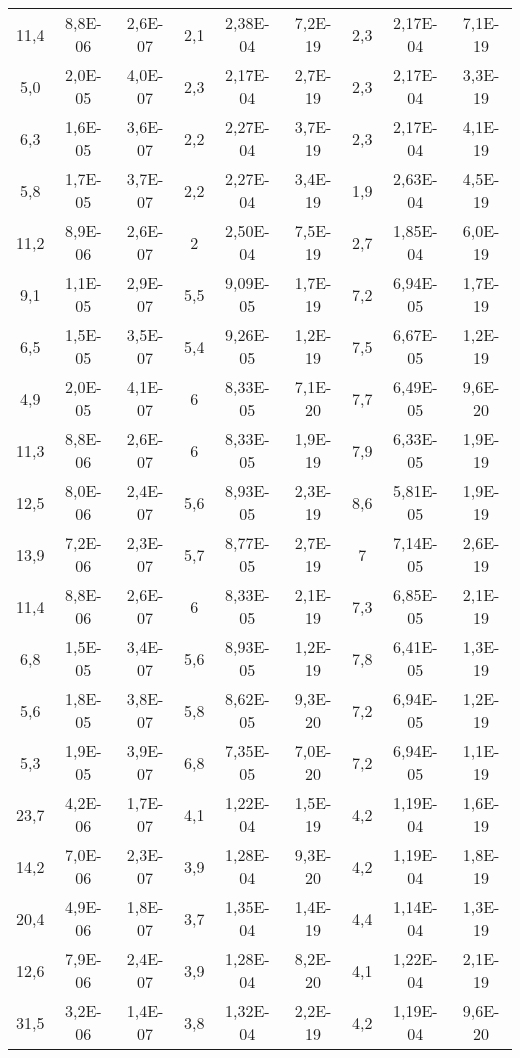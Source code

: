 \begin{longtable}{c c c| c c c |c c c}
        11,4 & 8,8E-06 & 2,6E-07 & 2,1 & 2,38E-04 & 7,2E-19 & 2,3 & 2,17E-04 & 7,1E-19 \\ 
        5,0 & 2,0E-05 & 4,0E-07 & 2,3 & 2,17E-04 & 2,7E-19 & 2,3 & 2,17E-04 & 3,3E-19 \\ 
        6,3 & 1,6E-05 & 3,6E-07 & 2,2 & 2,27E-04 & 3,7E-19 & 2,3 & 2,17E-04 & 4,1E-19 \\ 
        5,8 & 1,7E-05 & 3,7E-07 & 2,2 & 2,27E-04 & 3,4E-19 & 1,9 & 2,63E-04 & 4,5E-19 \\ 
        11,2 & 8,9E-06 & 2,6E-07 & 2 & 2,50E-04 & 7,5E-19 & 2,7 & 1,85E-04 & 6,0E-19 \\ 
        \midrule

        9,1 & 1,1E-05 & 2,9E-07 & 5,5 & 9,09E-05 & 1,7E-19 & 7,2 & 6,94E-05 & 1,7E-19 \\ 
        6,5 & 1,5E-05 & 3,5E-07 & 5,4 & 9,26E-05 & 1,2E-19 & 7,5 & 6,67E-05 & 1,2E-19 \\ 
        4,9 & 2,0E-05 & 4,1E-07 & 6 & 8,33E-05 & 7,1E-20 & 7,7 & 6,49E-05 & 9,6E-20 \\ 
        11,3 & 8,8E-06 & 2,6E-07 & 6 & 8,33E-05 & 1,9E-19 & 7,9 & 6,33E-05 & 1,9E-19 \\ 
        12,5 & 8,0E-06 & 2,4E-07 & 5,6 & 8,93E-05 & 2,3E-19 & 8,6 & 5,81E-05 & 1,9E-19 \\ 
        \midrule

        13,9 & 7,2E-06 & 2,3E-07 & 5,7 & 8,77E-05 & 2,7E-19 & 7 & 7,14E-05 & 2,6E-19 \\ 
        11,4 & 8,8E-06 & 2,6E-07 & 6 & 8,33E-05 & 2,1E-19 & 7,3 & 6,85E-05 & 2,1E-19 \\ 
        6,8 & 1,5E-05 & 3,4E-07 & 5,6 & 8,93E-05 & 1,2E-19 & 7,8 & 6,41E-05 & 1,3E-19 \\ 
        5,6 & 1,8E-05 & 3,8E-07 & 5,8 & 8,62E-05 & 9,3E-20 & 7,2 & 6,94E-05 & 1,2E-19 \\ 
        5,3 & 1,9E-05 & 3,9E-07 & 6,8 & 7,35E-05 & 7,0E-20 & 7,2 & 6,94E-05 & 1,1E-19 \\ 
        \midrule
    
        23,7 & 4,2E-06 & 1,7E-07 & 4,1 & 1,22E-04 & 1,5E-19 & 4,2 & 1,19E-04 & 1,6E-19 \\ 
        14,2 & 7,0E-06 & 2,3E-07 & 3,9 & 1,28E-04 & 9,3E-20 & 4,2 & 1,19E-04 & 1,8E-19 \\ 
        20,4 & 4,9E-06 & 1,8E-07 & 3,7 & 1,35E-04 & 1,4E-19 & 4,4 & 1,14E-04 & 1,3E-19 \\ 
        12,6 & 7,9E-06 & 2,4E-07 & 3,9 & 1,28E-04 & 8,2E-20 & 4,1 & 1,22E-04 & 2,1E-19 \\ 
        31,5 & 3,2E-06 & 1,4E-07 & 3,8 & 1,32E-04 & 2,2E-19 & 4,2 & 1,19E-04 & 9,6E-20 \\ 
        \midrule
    

\end{longtable}
